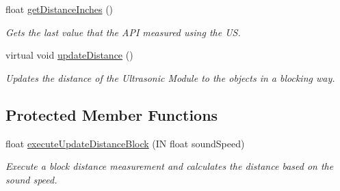 \begin{DoxyCompactItemize}
float \hyperlink{class_easyuino_1_1_distance_meter_a4e3c650c54382d9af6bca51dcac4e7a3}{get\+Distance\+Inches} ()
\begin{DoxyCompactList}\small\item\em Gets the last value that the A\+PI measured using the US. \end{DoxyCompactList}\item 
virtual void \hyperlink{class_easyuino_1_1_distance_meter_a739197578f06b58faedefd0526d49499}{update\+Distance} ()
\begin{DoxyCompactList}\small\item\em Updates the distance of the Ultrasonic Module to the objects in a blocking way. \end{DoxyCompactList}\end{DoxyCompactItemize}
\subsection*{Protected Member Functions}
\begin{DoxyCompactItemize}
\item 
float \hyperlink{class_easyuino_1_1_distance_meter_a4e02477669d61a3a7afb7deb9c53cf17}{execute\+Update\+Distance\+Block} (IN float sound\+Speed)
\begin{DoxyCompactList}\small\item\em Execute a block distance measurement and calculates the distance based on the sound speed. \end{DoxyCompactList}\end{DoxyCompactItemize}
